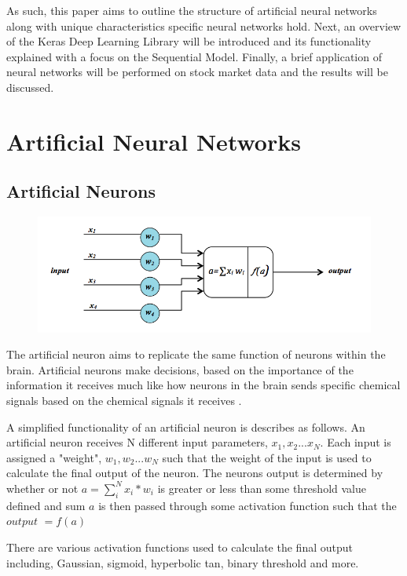 As such, this paper aims to outline the structure of artificial neural networks along with unique characteristics specific neural networks hold. Next, an overview of the Keras Deep Learning Library will be introduced and its functionality explained with a focus on the Sequential Model. Finally, a brief application of neural networks will be performed on stock market data and the results will be discussed. 

\section{Artificial Neural Networks}\label{sec:ANN}

\subsection{Artificial Neurons}\label{sec:formatting}
\begin{figure}[H]
\includegraphics[width=\columnwidth]{ArtificialNeuron}
\end{figure}
The  artificial neuron aims to replicate the same function of neurons within the brain. Artificial neurons make decisions, based on the importance of the information it receives much like how neurons in the brain sends specific chemical signals based on the chemical signals it receives \cite{kar}. 

 
A simplified functionality of an artificial neuron is describes as follows. An artificial neuron receives N different input parameters, $x_1, x_2... x_N$. Each input is assigned a "weight", $w_1,w_2...w_N$ such that the weight of the input is used to calculate the final output of the neuron. The neurons output is determined by whether or not $ a = \sum_i^N x_i*w_i$ is greater or less than some threshold value defined and sum $a$ is then passed through some activation function such that the $output$ $= f(a)$\cite{kar}

There are various activation functions used to calculate the final output including, Gaussian, sigmoid, hyperbolic tan, binary threshold and more. 
